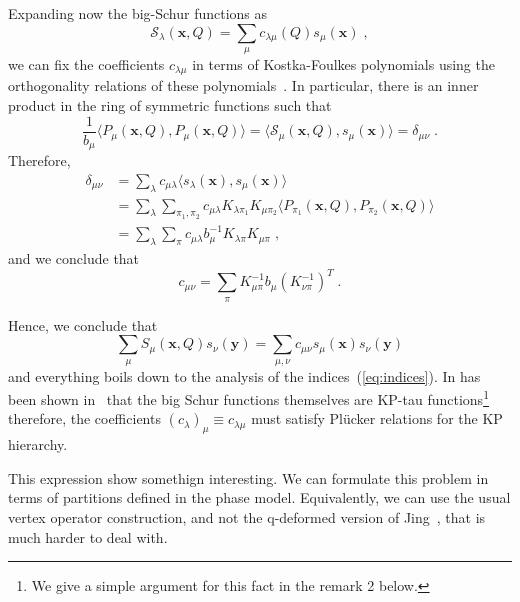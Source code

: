 \documentclass[a4paper,11pt]{amsart}
\begin{document}
Expanding now the big-Schur functions as
\begin{equation}
\label{eq:kf-exp}
  \mathcal{S}_\lambda(\bm{x}, Q) = \sum_{\mu} c_{\lambda\mu}(Q) s_\mu(\bm{x})\; ,
\end{equation}
we can fix the coefficients \(c_{\lambda\mu}\) in terms of Kostka-Foulkes
polynomials using the orthogonality relations of these polynomials~\cite{Macdonald:1998}. 
In particular, there is an inner product in the ring of symmetric functions such that
\begin{equation}
  \frac{1}{b_\mu}\langle P_\mu(\bm{x}, Q), P_\mu(\bm{x}, Q)\rangle = \langle
  \mathcal{S}_\mu(\bm{x}, Q), s_\mu(\bm{x})\rangle = \delta_{\mu\nu}\; .
\end{equation}
Therefore,
\begin{equation}
  \begin{split}
\delta_{\mu\nu} & = \sum_\lambda c_{\mu\lambda}  \langle s_\lambda(\bm{x}), s_\mu(\bm{x})\rangle\\
& = \sum_\lambda \sum_{\pi_1, \pi_2} c_{\mu\lambda}  K_{\lambda \pi_1} K_{\mu \pi_2}
\langle P_{\pi_1}(\bm{x}, Q), P_{\pi_2}(\bm{x}, Q)\rangle \\ 
& = \sum_\lambda \sum_{\pi} c_{\mu\lambda} b_{\mu}^{-1}  K_{\lambda \pi} K_{\mu \pi}\; ,
  \end{split}
\end{equation}
and we conclude that 
\begin{equation}
\label{eq:indices}
c_{\mu \nu} = \sum_\pi K_{\mu\pi}^{-1} b_\mu (K_{\nu\pi}^{-1})^T\; .
\end{equation}

Hence, we conclude that 
\begin{equation}
\sum_{\mu} S_{\mu}(\bm{x},Q) s_{\nu}(\bm{y}) = 
\sum_{\mu , \nu} c_{\mu\nu} s_{\mu}(\bm{x}) s_{\nu}(\bm{y}) 
\end{equation}
and everything boils down to the analysis of the
indices~(\ref{eq:indices}). In has been shown
in~\cite{Necoechea:2019wbg} that the big Schur functions themselves
are KP-tau functions\footnote{ We give a simple argument for this fact
in the remark 2 below.} therefore, the coefficients \((c_\lambda)_\mu
\equiv c_{\lambda\mu}\) must satisfy Plücker relations for the KP
hierarchy.

\begin{remark}
 This expression show somethign interesting. We can formulate this
problem in terms of partitions defined in the phase
model. Equivalently, we can use the usual vertex operator
construction, and not the q-deformed version of Jing~\emph{\cite{Jing1991,
  Jing1995}}, that is much harder to deal with.
\end{remark}
\end{document}
